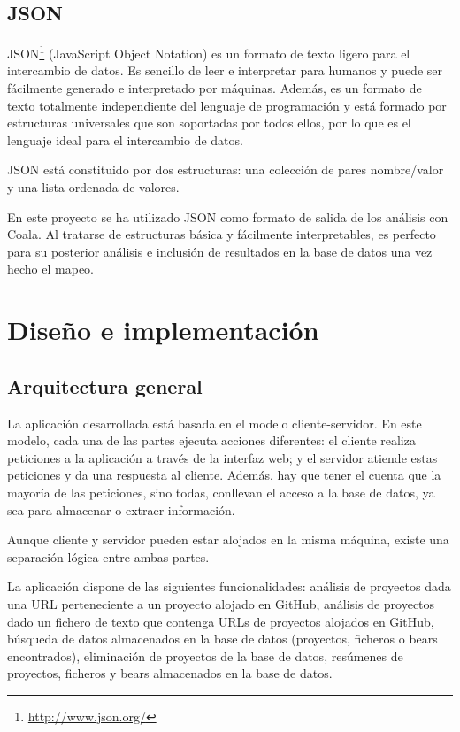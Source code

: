 \documentclass[a4paper, 12pt]{book}
\begin{document}
\section{JSON} 
\label{sec:seccion10}
JSON\footnote{\url{http://www.json.org/}} (JavaScript Object Notation) es un formato de texto ligero para el intercambio de datos. Es sencillo de leer e interpretar para humanos y puede ser fácilmente generado e interpretado por máquinas. Además, es un formato de texto totalmente independiente del lenguaje de programación y está formado por estructuras universales que son soportadas por todos ellos, por lo que es el lenguaje ideal para el intercambio de datos.

JSON está constituido por dos estructuras: una colección de pares nombre/valor y una lista ordenada de valores.

En este proyecto se ha utilizado JSON como formato de salida de los análisis con Coala. Al tratarse de estructuras básica y fácilmente interpretables, es perfecto para su posterior análisis e inclusión de resultados en la base de datos una vez hecho el mapeo.


\cleardoublepage
\chapter{Diseño e implementación}

\section{Arquitectura general} 
\label{sec:seccion11}
La aplicación desarrollada está basada en el modelo cliente-servidor. En este modelo, cada una de las partes ejecuta acciones diferentes: el cliente realiza peticiones a la aplicación a través de la interfaz web; y el servidor atiende estas peticiones y da una respuesta al cliente. Además, hay que tener el cuenta que la mayoría de las peticiones, sino todas, conllevan el acceso a la base de datos, ya sea para almacenar o extraer información.

Aunque cliente y servidor pueden estar alojados en la misma máquina, existe una separación lógica entre ambas partes.

La aplicación dispone de las siguientes funcionalidades: análisis de proyectos dada una URL perteneciente a un proyecto alojado en GitHub, análisis de proyectos dado un fichero de texto que contenga URLs de proyectos alojados en GitHub, búsqueda de datos almacenados en la base de datos (proyectos, ficheros o bears encontrados), eliminación de proyectos de la base de datos, resúmenes de proyectos, ficheros y bears almacenados en la base de datos.
\end{document}
